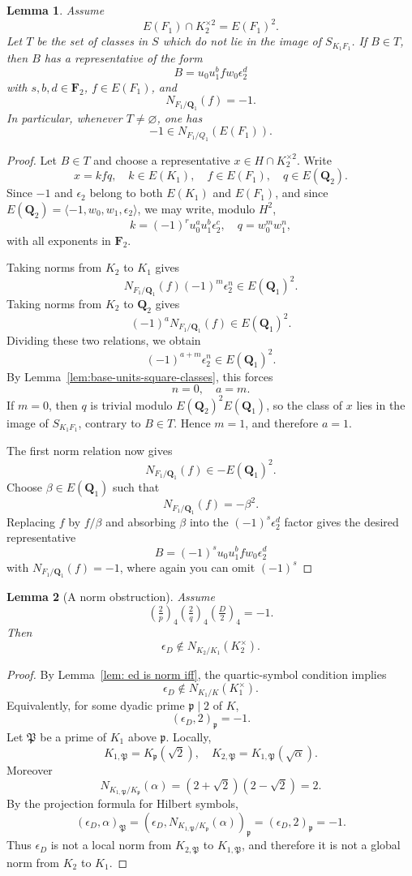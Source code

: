 \documentclass{article}
\numberwithin{equation}{section}
\theoremstyle{plain}  %
\newtheorem{lemma}{Lemma}[section]
\theoremstyle{definition}
\newcommand{\kron}[2]{\left( \tfrac{#1}{#2} \right)}
\newcommand{\fk}{\mathfrak }
\begin{document}
\begin{lemma}\label{lem:outside-normal-form}
Assume
$$
E(F_1) \cap K_2^{\times 2}=E(F_1)^2.
$$
Let $T$ be the set of classes in $S$ which do not lie in the image of $S_{K_1F_1}$. If $B \in T$, then $B$ has a representative of the form
$$
B= u_0 u_1^b f w_0\epsilon_2^d
$$
with $s,b,d \in \mathbf F_2$, $f \in E(F_1)$, and
$$
N_{F_1/\mathbf Q_1}(f)=-1.
$$
In particular, whenever $T \ne \varnothing$, one has
$$
-1 \in N_{F_1/Q_1}(E(F_1)).
$$
\end{lemma}

\begin{proof}
Let $B \in T$ and choose a representative $x \in H \cap K_2^{\times 2}$. Write
$$
x=kfq, \quad k \in E(K_1), \quad f \in E(F_1), \quad q \in E(\mathbf Q_2).
$$
Since $-1$ and $\epsilon_2$ belong to both $E(K_1)$ and $E(F_1)$, and since $E(\mathbf Q_2)=\langle -1,w_0,w_1,\epsilon_2\rangle$, we may write, modulo $H^2$,
$$
k=(-1)^r u_0^a u_1^b\epsilon_2^c, \quad q=w_0^m w_1^n,
$$
with all exponents in $\mathbf F_2$.

Taking norms from $K_2$ to $K_1$ gives
$$
N_{F_1/\mathbf Q_1}(f)(-1)^m\epsilon_2^n \in E(\mathbf Q_1)^2.
$$
Taking norms from $K_2$ to $\mathbf Q_2$ gives
$$
(-1)^aN_{F_1/\mathbf Q_1}(f) \in E(\mathbf Q_1)^2.
$$
Dividing these two relations, we obtain
$$
(-1)^{a+m}\epsilon_2^n \in E(\mathbf Q_1)^2.
$$
By Lemma~\ref{lem:base-units-square-classes}, this forces
$$
n=0, \quad a=m.
$$
If $m=0$, then $q$ is trivial modulo $E(\mathbf Q_2)^2E(\mathbf Q_1)$, so the class of $x$ lies in the image of $S_{K_1F_1}$, contrary to $B \in T$. Hence $m=1$, and therefore $a=1$.

The first norm relation now gives
$$
N_{F_1/\mathbf Q_1}(f) \in -E(\mathbf Q_1)^2.
$$
Choose $\beta \in E(\mathbf Q_1)$ such that
$$
N_{F_1/\mathbf Q_1}(f)=-\beta^2.
$$
Replacing $f$ by $f/\beta$ and absorbing $\beta$ into the $(-1)^s\epsilon_2^d$ factor gives the desired representative
$$
B=(-1)^s u_0u_1^b f w_0\epsilon_2^d
$$
with $N_{F_1/\mathbf Q_1}(f)=-1$, where again you can omit $(-1)^s$
\end{proof}

\begin{lemma}[A norm obstruction]\label{lem:epsilonD-not-norm-K2K1}
Assume
$$
\kron{2}{p}_4\kron{2}{q}_4\kron{D}{2}_4=-1.
$$
Then
$$
\epsilon_D \notin N_{K_2/K_1}(K_2^\times).
$$
\end{lemma}

\begin{proof}
By Lemma~\ref{lem: ed is norm iff}, the quartic-symbol condition implies
$$
\epsilon_D \notin N_{K_1/K}(K_1^\times).
$$
Equivalently, for some dyadic prime $\fk p \mid 2$ of $K$,
$$
(\epsilon_D,2)_{\fk p}=-1.
$$
Let $\fk P$ be a prime of $K_1$ above $\fk p$. Locally,
$$
K_{1,\fk P}=K_{\fk p}(\sqrt 2), \quad K_{2,\fk P}=K_{1,\fk P}(\sqrt \alpha).
$$
Moreover
$$
N_{K_{1,\fk P}/K_{\fk p}}(\alpha)=(2+\sqrt 2)(2-\sqrt 2)=2.
$$
By the projection formula for Hilbert symbols,
$$
(\epsilon_D,\alpha)_{\fk P}=(\epsilon_D,N_{K_{1,\fk P}/K_{\fk p}}(\alpha))_{\fk p}=(\epsilon_D,2)_{\fk p}=-1.
$$
Thus $\epsilon_D$ is not a local norm from $K_{2,\fk P}$ to $K_{1,\fk P}$, and therefore it is not a global norm from $K_2$ to $K_1$.
\end{proof}
\end{document}
